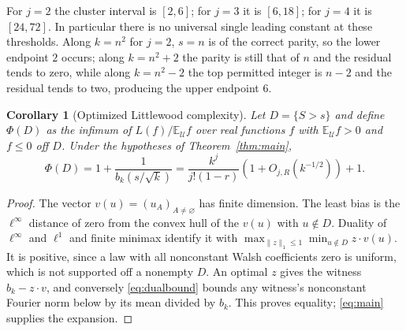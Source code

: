 \documentclass[11pt]{article}
\newtheorem{corollary}[theorem]{Corollary}
\theoremstyle{remark}\newtheorem{remark}[theorem]{Remark}
\newcommand{\E}{\mathbb E}
\newcommand{\U}{\mathcal U}
\begin{document}
For $j=2$ the cluster interval is $[2,6]$; for $j=3$ it is $[6,18]$; for $j=4$ it is $[24,72]$. In particular there is no universal single leading constant at these thresholds. Along $k=n^2$ for $j=2$, $s=n$ is of the correct parity, so the lower endpoint $2$ occurs; along $k=n^2+2$ the parity is still that of $n$ and the residual tends to zero, while along $k=n^2-2$ the top permitted integer is $n-2$ and the residual tends to two, producing the upper endpoint $6$.

\begin{corollary}[Optimized Littlewood complexity]\label{cor:littlewood}
Let $D=\{S>s\}$ and define $\Phi(D)$ as the infimum of $L(f)/\E_\U f$ over real functions $f$ with $\E_\U f>0$ and $f\le0$ off $D$. Under the hypotheses of Theorem~\ref{thm:main},
\[
 \Phi(D)=1+\frac1{b_k(s/\sqrt{k})}
 =\frac{k^j}{j!(1-r)}(1+O_{j,R}(k^{-1/2}))+1.
\]
\end{corollary}
\begin{proof}
The vector $v(u)=(u_A)_{A\ne\varnothing}$ has finite dimension. The least bias is the $\ell^\infty$ distance of zero from the convex hull of the $v(u)$ with $u\notin D$. Duality of $\ell^\infty$ and $\ell^1$ and finite minimax identify it with $\max_{\|z\|_1\le1}\min_{u\notin D}z\cdot v(u)$. It is positive, since a law with all nonconstant Walsh coefficients zero is uniform, which is not supported off a nonempty $D$. An optimal $z$ gives the witness $b_k-z\cdot v$, and conversely \eqref{eq:dualbound} bounds any witness's nonconstant Fourier norm below by its mean divided by $b_k$. This proves equality; \eqref{eq:main} supplies the expansion.
\end{proof}
\end{document}
